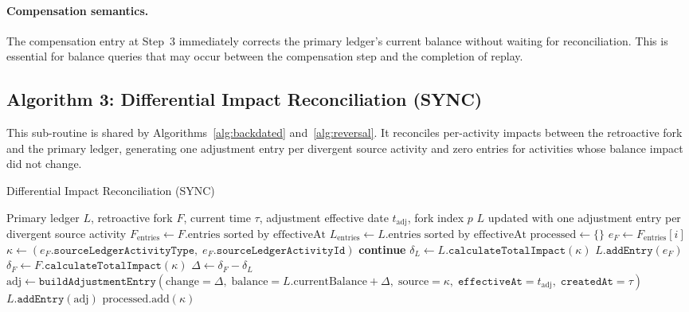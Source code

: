 \documentclass[11pt,letterpaper]{article}
\begin{document}
\paragraph{Compensation semantics.}
The compensation entry at Step~3 immediately corrects the primary
ledger's current balance without waiting for reconciliation. This is
essential for balance queries that may occur between the compensation
step and the completion of replay.

\subsection{Algorithm 3: Differential Impact Reconciliation (SYNC)}
\label{sec:alg-sync}

This sub-routine is shared by Algorithms~\ref{alg:backdated}
and~\ref{alg:reversal}. It reconciles per-activity impacts between the
retroactive fork and the primary ledger, generating one adjustment entry
per divergent source activity and zero entries for activities whose
balance impact did not change.

\begin{algorithm}[H]
\caption{Differential Impact Reconciliation (SYNC)}
\label{alg:sync}
\begin{algorithmic}[1]
\Require Primary ledger $L$, retroactive fork $F$, current time $\tau$,
         adjustment effective date $t_{\text{adj}}$, fork index $p$
\Ensure $L$ updated with one adjustment entry per divergent source activity
\State $F_{\text{entries}} \leftarrow F.\text{entries sorted by effectiveAt}$
\State $L_{\text{entries}} \leftarrow L.\text{entries sorted by effectiveAt}$
  \State \Return
\EndIf
\State $\text{processed} \leftarrow \{\}$
  \State $e_F \leftarrow F_{\text{entries}}[i]$
  \State $\kappa \leftarrow (e_F.\texttt{sourceLedgerActivityType},\;
         e_F.\texttt{sourceLedgerActivityId})$
    \State \textbf{continue}
  \EndIf
  \State $\delta_L \leftarrow L.\texttt{calculateTotalImpact}(\kappa)$
    \State $L.\texttt{addEntry}(e_F)$ 
  \Else
    \State $\delta_F \leftarrow F.\texttt{calculateTotalImpact}(\kappa)$
      \State $\Delta \leftarrow \delta_F - \delta_L$
      \State $\text{adj} \leftarrow \texttt{buildAdjustmentEntry}(
             \text{change} = \Delta,\;
             \text{balance} = L.\text{currentBalance} + \Delta,\;
             \text{source} = \kappa,\;
             \texttt{effectiveAt} = t_{\text{adj}},\;
             \texttt{createdAt} = \tau)$
      \State $L.\texttt{addEntry}(\text{adj})$
    \EndIf
  \EndIf
  \State $\text{processed}.\text{add}(\kappa)$
\EndFor
\end{algorithmic}
\end{algorithm}
\end{document}
